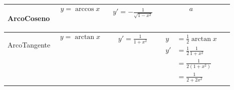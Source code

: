 \documentclass[../../main]{subfiles}
\begin{document}
\begin{center}
{\begin{tabular}{ |p{7em}|p{5em}|p{5em}|p{7em}|p{5cm}| }
            \begin{center}
                ArcoCoseno
            \end{center} &
            \begin{align}
                y=\arccos{x} \nonumber
            \end{align}  &
            \begin{align}
                y'= -\frac{1}{\sqrt{1-x^2}} \nonumber
            \end{align} &
            {
                \begin{align}
                a
                \end{align}
            } &
            {
            \begin{center}
            \end{center}
            } \\

            \hline
            
            \begin{center}
                ArcoTangente
            \end{center} &
            \begin{align}
                y=\arctan{x} \nonumber
            \end{align}  &
            \begin{align}
                y'= \frac{1}{1+x^2} \nonumber
            \end{align} &
            {
                \begin{align}
                   y &= \frac{1}{2}\arctan{x} \nonumber \\
                   y' &= \frac{1}{2} \frac{1}{1+x^2} \nonumber \\
                      &= \frac{1}{2(1+x^2)} \nonumber \\
                      &= \frac{1}{2+2x^2} \nonumber
                \end{align}
            } &
            {
            \begin{center}
            \end{center}
            } \\

            \hline


\end{tabular}}
\end{center}
\end{document}
